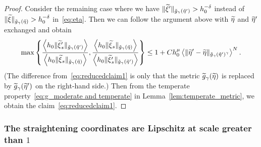 \documentclass[10pt]{amsart}
\theoremstyle{definition}\newtheorem{defi}[theo]{Definition}\newtheorem{rema}[theo]{Remark}\newtheorem{exam}[theo]{Example}\newtheorem{exem}[theo]{Example}\newtheorem{nota}[theo]{Notation}
\let\oldtilde\tilde
\renewcommand*{\tilde}[1]{\mathchoice{\widetilde{#1}}{\widetilde{#1}}{\oldtilde{#1}}{\oldtilde{#1}}}
\begin{document}
\begin{proof}
Consider the remaining case where we have $\|\tilde{\xi}'\|_{\tilde{g}_{\gamma}(\tilde{\eta}')}>h_{0}^{-\delta}$ instead of $\|\tilde{\xi}\|_{\tilde{g}_{\gamma}(\tilde{\eta})}\linebreak >h_{0}^{-\delta}$ in~\eqref{eq:eta}. Then we can follow the argument above with $\tilde{\eta}$ and $\tilde{\eta}'$ exchanged and obtain
\begin{equation}\label{eq:reducedclaim2}
\max\left\{ \frac{\left\langle h_{0}\|\tilde{\xi}'_{s}\|_{\tilde{g}_{\gamma}\left(\tilde{\eta}'\right)}\right\rangle}{\left\langle h_{0}\|\tilde{\xi}_{s}\|_{\tilde{g}_{\gamma}\left(\tilde{\eta}\right)}\right\rangle},\frac{\left\langle h_{0}\|\tilde{\xi}_{s}\|_{\tilde{g}_{\gamma}\left(\tilde{\eta}\right)}\right\rangle}{\left\langle h_{0}\|\tilde{\xi}'_{s}\|_{\tilde{g}_{\gamma}\left(\tilde{\eta}'\right)}\right\rangle}\right\} \le1+Ch_{0}^{\mu}\left\langle\|\tilde{\eta}'-\tilde{\eta}\|_{\tilde{g}_{\gamma}\left(\tilde{\eta}'\right)^{\gamma}}\right\rangle^{N}.
\end{equation}
(The difference from~\eqref{eq:reducedclaim1} is only that the metric $\tilde{g}_{\gamma}(\tilde{\eta})$ is replaced by $\tilde{g}_{\gamma}(\tilde{\eta}')$ on the right-hand side.) Then from the temperate property~\eqref{eq:g_moderate and temperate} in Lemma~\ref{lem:temperate_metric}, we obtain the claim~\eqref{eq:reducedclaim1}.
\end{proof}

\subsubsection{The straightening coordinates are Lipschitz at scale greater than \texorpdfstring{$1$}{1}}
\end{document}
